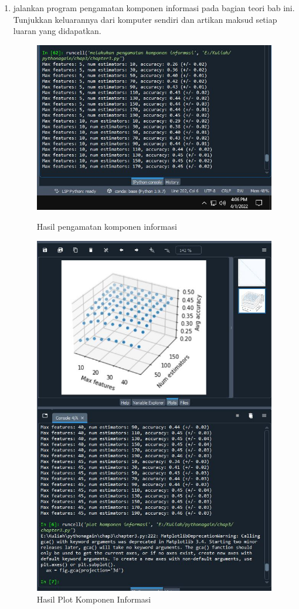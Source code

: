 \begin{enumerate}
\item jalankan program pengamatan komponen informasi pada bagian teori bab ini. Tunjukkan keluarannya dari komputer sendiri dan artikan maksud setiap luaran yang didapatkan.
\newpage
\begin{figure}[!htbp]
    \centering
    \includegraphics[scale=0.6]{figures/chap3komponeninformasi.JPG}
    \caption{Hasil pengamatan komponen informasi}
    \includegraphics[scale=0.4]{figures/chap3plotkomponen.JPG}
    \caption{Hasil Plot Komponen Informasi}
\end{figure}
\end{enumerate}


